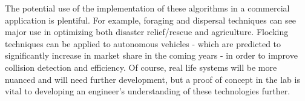The potential use of the implementation of these algorithms in a commercial application is plentiful. For example, foraging and dispersal techniques can see major use in optimizing both disaster relief/rescue and agriculture. Flocking techniques can be applied to autonomous vehicles - which are predicted to significantly increase in market share in the coming years - in order to improve collision detection and efficiency. Of course, real life systems will be more nuanced and will need further development, but a proof of concept in the lab is vital to developing an engineer's understanding of these technologies further.

